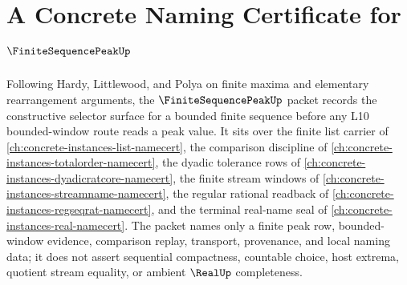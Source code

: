 \chapter{A Concrete Naming Certificate for $\FiniteSequencePeakUp$}
\label{ch:concrete-instances-finite-sequence-peak-namecert}

Following Hardy, Littlewood, and Polya on finite maxima and elementary rearrangement arguments, the $\FiniteSequencePeakUp$ packet records the constructive selector surface for a bounded finite sequence before any L10 bounded-window route reads a peak value. It sits over the finite list carrier of \autoref{ch:concrete-instances-list-namecert}, the comparison discipline of \autoref{ch:concrete-instances-totalorder-namecert}, the dyadic tolerance rows of \autoref{ch:concrete-instances-dyadicratcore-namecert}, the finite stream windows of \autoref{ch:concrete-instances-streamname-namecert}, the regular rational readback of \autoref{ch:concrete-instances-regseqrat-namecert}, and the terminal real-name seal of \autoref{ch:concrete-instances-real-namecert}. The packet names only a finite peak row, bounded-window evidence, comparison replay, transport, provenance, and local naming data; it does not assert sequential compactness, countable choice, host extrema, quotient stream equality, or ambient $\RealUp$ completeness.

